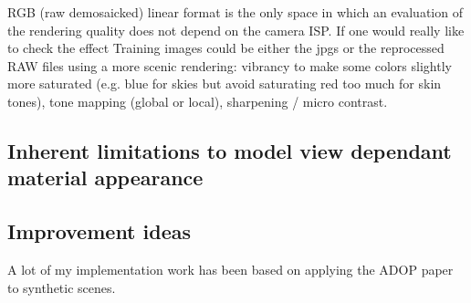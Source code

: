 RGB (raw demosaicked) linear format is the only space in which an evaluation of the rendering quality does not depend on the camera ISP.
If one would really like to check the effect Training images could be either the jpgs or the reprocessed RAW files using a more scenic rendering: vibrancy to make some colors slightly more saturated (e.g. blue for skies but avoid saturating red too much for skin tones), tone mapping (global or local), sharpening / micro contrast.

\subsection{Inherent limitations to model view dependant material appearance}
\label{subsec:view_dependant_materials}

\subsection{Improvement ideas}
\label{subsec:improvement_ideas}
A lot of my implementation work has been based on applying the ADOP paper to synthetic scenes.
